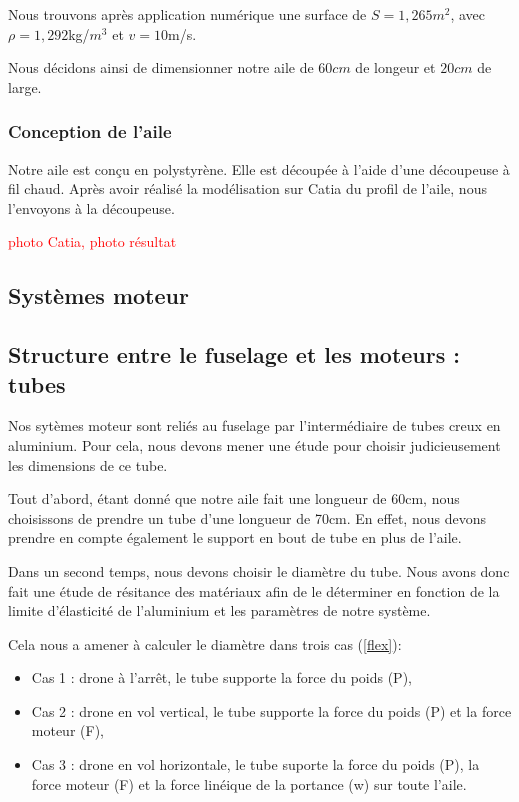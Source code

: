 \documentclass[a4paper,12pt,french]{report}
\begin{document}
Nous trouvons après application numérique une surface de $S=1,265$$m^2$, avec $\rho=1,292$kg/$m^3$ et $v=10$m/s.\newline

    Nous décidons ainsi de dimensionner notre aile de $60cm$ de longeur et $20cm$ de large.

\subsubsection*{Conception de l'aile}

Notre aile est conçu en polystyrène. Elle est découpée à l'aide d'une découpeuse à fil chaud. Après avoir réalisé la modélisation sur Catia du profil de l'aile, nous l'envoyons à la découpeuse.

\textcolor{red}{photo Catia, photo résultat}

\subsection{Systèmes moteur}

\subsection{Structure entre le fuselage et les moteurs : tubes}

Nos sytèmes moteur sont reliés au fuselage par l'intermédiaire de tubes creux en aluminium. Pour cela, nous devons mener une étude pour choisir judicieusement les dimensions de ce tube.\newline

Tout d'abord, étant donné que notre aile fait une longueur de 60cm, nous choisissons de prendre un tube d'une longueur de 70cm. En effet, nous devons prendre en compte également le support en bout de tube en plus de l'aile.\newline

Dans un second temps, nous devons choisir le diamètre du tube. Nous avons donc fait une étude de résitance des matériaux afin de le déterminer en fonction de la limite d'élasticité de l'aluminium et les paramètres de notre système.\newline

Cela nous a amener à calculer le diamètre dans trois cas (\ref{flex}):
\begin{itemize}
    \item Cas 1 : drone à l'arrêt, le tube supporte la force du poids (P),
    \item Cas 2 : drone en vol vertical, le tube supporte la force du poids (P) et la force moteur (F),
    \item Cas 3 : drone en vol horizontale, le tube suporte la force du poids (P), la force moteur (F) et la force linéique de la portance (w) sur toute l'aile.
\end{itemize}
\end{document}
